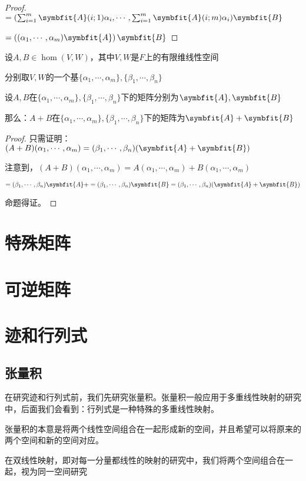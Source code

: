 \documentclass[12pt, a4paper, oneside, UTF8]{ctexbook}
\begin{document}
\begin{para}{0}
\begin{proof}
						$=(\sum_{i=1}^m\symbfit{A}(i;1)\alpha_i  , \cdots ,\sum_{i=1}^m\symbfit{A}(i;m)\alpha_i)\symbfit{B}$

						$=\left((\alpha_1,\cdots,\alpha_m)\symbfit{A}\right)\symbfit{B}$
					\end{proof}
				\point{}
					\begin{proposition}
						设$A,B \in \hom(V,W)$，其中$V,W$是$F$上的有限维线性空间

						分别取$V,W$的一个基$\{\alpha_1,\cdots,\alpha_m\},\{\beta_1,\cdots,\beta_n\}$

						设$A,B$在$\{\alpha_1,\cdots,\alpha_m\},\{\beta_1,\cdots,\beta_n\}$下的矩阵分别为$\symbfit{A},\symbfit{B}$

						那么：$A+B$在$\{\alpha_1,\cdots,\alpha_m\},\{\beta_1,\cdots,\beta_n\}$下的矩阵为$\symbfit{A}+\symbfit{B}$
					\end{proposition}
					\begin{proof}
						只需证明：$(A+B)(\alpha_1,\cdots,\alpha_m)=(\beta_1,\cdots,\beta_n)(\symbfit{A}+\symbfit{B})$
					
						注意到，$(A+B)(\alpha_1,\cdots,\alpha_m)=A(\alpha_1,\cdots,\alpha_m)+B(\alpha_1,\cdots,\alpha_m)$

						$=(\beta_1,\cdots,\beta_n)\symbfit{A}+=(\beta_1,\cdots,\beta_n)\symbfit{B}=(\beta_1,\cdots,\beta_n)(\symbfit{A}+\symbfit{B})$

						命题得证。
					\end{proof}
			\end{para}
	\section{特殊矩阵}
	\section{可逆矩阵}
	\section{迹和行列式}
		\subsection{张量积}
			在研究迹和行列式前，我们先研究张量积。张量积一般应用于多重线性映射的研究中，后面我们会看到：行列式是一种特殊的多重线性映射。

			张量积的本意是将两个线性空间组合在一起形成新的空间，并且希望可以将原来的两个空间和新的空间对应。

			在双线性映射，即对每一分量都线性的映射的研究中，我们将两个空间组合在一起，视为同一空间研究
\end{document}
